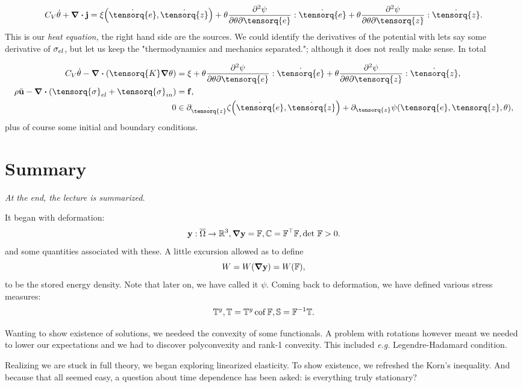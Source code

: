 \documentclass[reqno, a4paper]{article}
\begin{document}
\[
	C_V \dot{\theta} + \divergence{\vb{j}} = \xi\qty(\dot{\tensorq{e}}, \dot{\tensorq{z}}) + \theta \pdv[2]{\psi}{\theta}{\tensorq{e}}: \dot{\tensorq{e}} + \theta \pdv[2]{\psi}{\theta}{\tensorq{z}}: \dot{\tensorq{z}}.
\]
This is our \textit{heat equation,} the right hand side are the sources. We could identify the derivatives of the potential with lets say some derivative of $\mathbb{\sigma}_{el}$, but let us keep the "thermodynamics and mechanics separated."; although it does not really make sense. In total

\begin{align*}
	C_V \dot{\theta} - \divergence{\qty(\tensorq{K} \grad \theta)} & = \xi + \theta \pdv[2]{\psi}{\theta}{\tensorq{e}}:\dot{\tensorq{e}}+ \theta \pdv[2]{\psi}{\theta}{\tensorq{z}}:\dot{\tensorq{z}}, \\
	\rho \ddot{\vb{u}} - \divergence{\qty(\tensorq{\sigma}_{el}+ \tensorq{\sigma}_{in})} &= \vb{f}, \\
	0 &\in \partial_{\dot{\tensorq{z}}}\zeta\qty(\dot{\tensorq{e}}, \dot{\tensorq{z}})+ \partial_{\tensorq{z}}\psi\qty(\tensorq{e}, \tensorq{z}, \theta),
\end{align*}
plus of course some initial and boundary conditions.

\section{Summary}
\label{sec:summary}
\textit{At the end, the lecture is summarized.}


It began with deformation:
\[
	\vb{y}: \overline{\Omega} \to {\mathbb R}^{3}, \grad \vb{y} = \mathbb{F}, \mathbb{C} = \mathbb{F}^\top\mathbb{F}, \det\, \mathbb{F} >0.
\]
and some quantities associated with these. A little excursion allowed as to define
\[
	W = W\qty(\grad \vb{y}) = W\qty(\mathbb{F}),
\]
to be the stored energy density. Note that later on, we have called it $\psi$. 
Coming back to deformation, we have defined various stress measures:
\[
	\mathbb{T}^y, \mathbb{T} = \mathbb{T}^y \operatorname{cof} \mathbb{F}, \mathbb{S} =\mathbb{F}^{-1} \mathbb{T}.
\]

Wanting to show existence of solutions, we needeed the convexity of some functionals. A problem with rotations however meant we needed to lower our expectations and we had to discover polyconvexity and rank-1 convexity. This included \textit{e.g.} Legendre-Hadamard condition.

Realizing we are stuck in full theory, we began exploring linearized elasticity. To show existence, we refreshed the Korn's inequality. And because that all seemed easy, a question about time dependence has been asked: is everything truly stationary?
\end{document}
